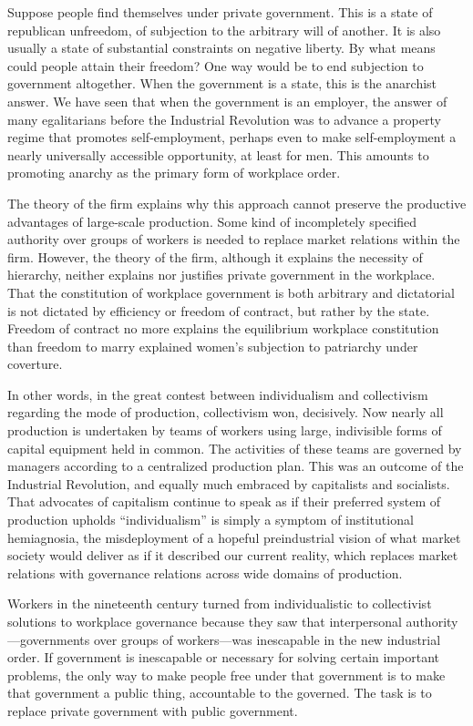 \documentclass[
  letterpaper,
  11pt,
  DIV=9,
  openright]{scrbook}
\begin{document}
Suppose people find themselves under private government. This is a state
of republican unfreedom, of subjection to the arbitrary will of another.
It is also usually a state of substantial constraints on negative
liberty. By what means could people attain their freedom? One way would
be to end subjection to government altogether. When the government is a
state, this is the anarchist answer. We have seen that when the
government is an employer, the answer of many egalitarians before the
Industrial Revolution was to advance a property regime that promotes
self-employment, perhaps even to make self-employment a nearly
universally accessible opportunity, at least for men. This amounts to
promoting anarchy as the primary form of workplace order.

The theory of the firm explains why this approach cannot preserve the
productive advantages of large-scale production. Some kind of
incompletely specified authority over groups of workers is needed to
replace market relations within the firm. However, the theory of the
firm, although it explains the necessity of hierarchy, neither explains
nor justifies private government in the workplace. That the constitution
of workplace government is both arbitrary and dictatorial is not
dictated by efficiency or freedom of contract, but rather by the state.
Freedom of contract no more explains the equilibrium workplace
constitution than freedom to marry explained women's subjection to
patriarchy under coverture.

In other words, in the great contest between individualism and
collectivism regarding the mode of production, collectivism won,
decisively. Now nearly all production is undertaken by teams of workers
using large, indivisible forms of capital equipment held in common. The
activities of these teams are governed by managers according to a
centralized production plan. This was an outcome of the Industrial
Revolution, and equally much embraced by capitalists and socialists.
That advocates of capitalism continue to speak as if their preferred
system of production upholds ``individualism'' is simply a symptom of
institutional hemiagnosia, the misdeployment of a hopeful preindustrial
vision of what market society would deliver as if it described our
current reality, which replaces market relations with governance
relations across wide domains of production.

Workers in the nineteenth century turned from individualistic to
collectivist solutions to workplace governance because they saw that
interpersonal authority---governments over groups of workers---was
inescapable in the new industrial order. If government is inescapable or
necessary for solving certain important problems, the only way to make
people free under that government is to make that government a public
thing, accountable to the governed. The task is to replace private
government with public government.
\end{document}
